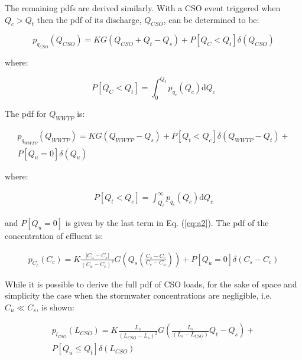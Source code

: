 \documentclass[draft,linenumbers]{agujournal2018}
\begin{document}
The remaining pdfs are derived similarly. With a CSO event triggered when $Q_c > Q_t$ then the pdf of its discharge, $Q_{CSO}$, can be determined to be:
\begin{linenomath*}
\begin{equation}	
p_{q_{CSO}}\left(Q_{CSO} \right) = K G\left(Q_{CSO}+Q_t-Q_s \right) + P\left[Q_{C} < Q_t\right] \delta\left(Q_{CSO}\right)
\label{eq:a6}
\end{equation}
\end{linenomath*}
where:
\begin{linenomath*}
\begin{equation}	
P\left[ Q_{C} < Q_t\right] = \int_{0}^{Q_t} p_{q_c}\left(Q_c\right) \mathrm{d}Q_c 
\label{eq:a7}
\end{equation}
\end{linenomath*}
The pdf for $Q_{WWTP}$ is:
\begin{linenomath*}
\begin{eqnarray}\nonumber
p_{q_{WWTP}}\left(Q_{WWTP}\right) = K G\left( Q_{WWTP} - Q_s\right) + P\left[Q_t < Q_c\right]\delta\left(Q_{WWTP} - Q_t\right) + \\
P\left[Q_u = 0\right]\delta\left(Q_{u}\right)
\label{eq:a8}
\end{eqnarray}
\end{linenomath*}
where:
\begin{linenomath*}
\begin{eqnarray}
P\left[Q_t < Q_c\right] = \int_{Q_t}^{\infty} p_{q_c}\left(Q_c\right)\mathrm{d}Q_c 
\label{eq:a9}
\end{eqnarray}
\end{linenomath*}
and $P\left[Q_u=0\right]$ is given by the last term in Eq. (\ref{eq:a2}). The pdf of the concentration of ef\/f\/luent is:
\begin{linenomath*}
\begin{eqnarray}
p_{C_c}\left(C_c \right) = K \frac{\left| C_u - C_s \right|}{\left(C_u - C_c \right)^2}  G\left(Q_s \left(\frac{C_s-C_c}{C_c-C_u }\right) \right) +  P\left[Q_u = 0\right] \delta\left(C_s - C_c\right) 
\label{eq:a10}
\end{eqnarray}
\end{linenomath*}
While it is possible to derive the full pdf of CSO loads, for the sake of space and simplicity the case when the stormwater concentrations are negligible, i.e.$C_u\ll C_s$, is shown:
\begin{linenomath*}
\begin{eqnarray}\nonumber
p_{l_{CSO}} \left(L_{CSO} \right) = K  \frac{L_s}{\left(L_{CSO}-L_s \right)^2}    G\left(\frac{L_s}{\left(L_s - L_{CSO}\right)}  Q_t - Q_s \right)  + \\
P\left[Q_u \le Q_t \right]\delta\left(L_{CSO}\right)
\label{eq:a11}
\end{eqnarray}
\end{linenomath*}
\end{document}
